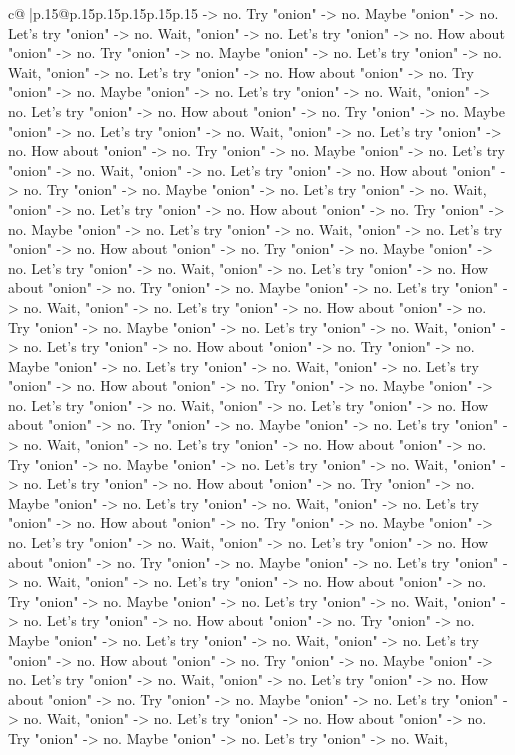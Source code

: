 \documentclass{article}
\begin{document}
{\begin{supertabular}{c@{$\;$}|p{.15\linewidth}@{}p{.15\linewidth}p{.15\linewidth}p{.15\linewidth}p{.15\linewidth}p{.15\linewidth}}
{{{{-}> no. Try "onion" {-}> no. Maybe "onion" {-}> no. Let's try "onion" {-}> no. Wait, "onion" {-}> no. Let's try "onion" {-}> no. How about "onion" {-}> no. Try "onion" {-}> no. Maybe "onion" {-}> no. Let's try "onion" {-}> no. Wait, "onion" {-}> no. Let's try "onion" {-}> no. How about "onion" {-}> no. Try "onion" {-}> no. Maybe "onion" {-}> no. Let's try "onion" {-}> no. Wait, "onion" {-}> no. Let's try "onion" {-}> no. How about "onion" {-}> no. Try "onion" {-}> no. Maybe "onion" {-}> no. Let's try "onion" {-}> no. Wait, "onion" {-}> no. Let's try "onion" {-}> no. How about "onion" {-}> no. Try "onion" {-}> no. Maybe "onion" {-}> no. Let's try "onion" {-}> no. Wait, "onion" {-}> no. Let's try "onion" {-}> no. How about "onion" {-}> no. Try "onion" {-}> no. Maybe "onion" {-}> no. Let's try "onion" {-}> no. Wait, "onion" {-}> no. Let's try "onion" {-}> no. How about "onion" {-}> no. Try "onion" {-}> no. Maybe "onion" {-}> no. Let's try "onion" {-}> no. Wait, "onion" {-}> no. Let's try "onion" {-}> no. How about "onion" {-}> no. Try "onion" {-}> no. Maybe "onion" {-}> no. Let's try "onion" {-}> no. Wait, "onion" {-}> no. Let's try "onion" {-}> no. How about "onion" {-}> no. Try "onion" {-}> no. Maybe "onion" {-}> no. Let's try "onion" {-}> no. Wait, "onion" {-}> no. Let's try "onion" {-}> no. How about "onion" {-}> no. Try "onion" {-}> no. Maybe "onion" {-}> no. Let's try "onion" {-}> no. Wait, "onion" {-}> no. Let's try "onion" {-}> no. How about "onion" {-}> no. Try "onion" {-}> no. Maybe "onion" {-}> no. Let's try "onion" {-}> no. Wait, "onion" {-}> no. Let's try "onion" {-}> no. How about "onion" {-}> no. Try "onion" {-}> no. Maybe "onion" {-}> no. Let's try "onion" {-}> no. Wait, "onion" {-}> no. Let's try "onion" {-}> no. How about "onion" {-}> no. Try "onion" {-}> no. Maybe "onion" {-}> no. Let's try "onion" {-}> no. Wait, "onion" {-}> no. Let's try "onion" {-}> no. How about "onion" {-}> no. Try "onion" {-}> no. Maybe "onion" {-}> no. Let's try "onion" {-}> no. Wait, "onion" {-}> no. Let's try "onion" {-}> no. How about "onion" {-}> no. Try "onion" {-}> no. Maybe "onion" {-}> no. Let's try "onion" {-}> no. Wait, "onion" {-}> no. Let's try "onion" {-}> no. How about "onion" {-}> no. Try "onion" {-}> no. Maybe "onion" {-}> no. Let's try "onion" {-}> no. Wait, "onion" {-}> no. Let's try "onion" {-}> no. How about "onion" {-}> no. Try "onion" {-}> no. Maybe "onion" {-}> no. Let's try "onion" {-}> no. Wait, "onion" {-}> no. Let's try "onion" {-}> no. How about "onion" {-}> no. Try "onion" {-}> no. Maybe "onion" {-}> no. Let's try "onion" {-}> no. Wait, "onion" {-}> no. Let's try "onion" {-}> no. How about "onion" {-}> no. Try "onion" {-}> no. Maybe "onion" {-}> no. Let's try "onion" {-}> no. Wait, "onion" {-}> no. Let's try "onion" {-}> no. How about "onion" {-}> no. Try "onion" {-}> no. Maybe "onion" {-}> no. Let's try "onion" {-}> no. Wait, "onion" {-}> no. Let's try "onion" {-}> no. How about "onion" {-}> no. Try "onion" {-}> no. Maybe "onion" {-}> no. Let's try "onion" {-}> no. Wait, "onion" {-}> no. Let's try "onion" {-}> no. How about "onion" {-}> no. Try "onion" {-}> no. Maybe "onion" {-}> no. Let's try "onion" {-}> no. Wait, }}}
\end{supertabular}}
\end{document}
